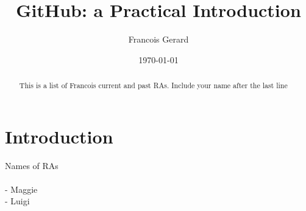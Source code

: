 \documentclass[12pt]{article}
\begin{document}
\title{GitHub: a Practical Introduction} %
\author{Francois Gerard}


\date{\today}  %

\maketitle 

\begin{abstract} 

	This is a list of Francois current and past RAs. Include your name after the last line
	
\end{abstract}

\section{Introduction}
Names of RAs \\ \\
- Maggie \\
- Luigi  \\
	 
\end{document}
